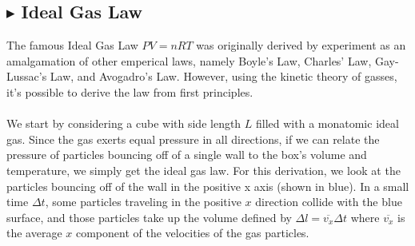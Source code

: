 %
%
\subsection{\color{Orchid} $\blacktriangleright$ \color{black} Ideal Gas Law}\label{2.1.4}
The famous Ideal Gas Law $PV = nRT$ was originally derived by experiment as an amalgamation of other emperical laws, namely Boyle's Law, Charles' Law, Gay-Lussac's Law, and Avogadro's Law. However, using the kinetic theory of gasses, it's possible to derive the law from first principles.\\
\\
We start by considering a cube with side length $L$ filled with a monatomic ideal gas. Since the gas exerts equal pressure in all directions, if we can relate the pressure of particles bouncing off of a single wall to the box's volume and temperature, we simply get the ideal gas law. For this derivation, we look at the particles bouncing off of the wall in the positive x axis (shown in blue). In a small time $\Delta t$, some particles traveling in the positive $x$ direction collide with the blue surface, and those particles take up the volume defined by $\Delta l = \overline{v_x}\Delta t$ where $\overline{v_x}$ is the average $x$ component of the velocities of the gas particles.
